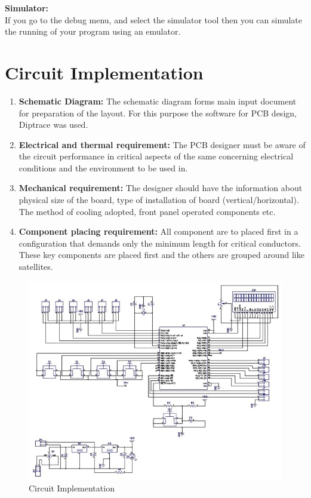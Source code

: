 \documentclass[12pt,a4paper,oneside,openright]{report}
\begin{document}
\textbf{Simulator:}\\
 If you go to the debug menu, and select the simulator tool then you can simulate the running of your program using an emulator.

\section{Circuit Implementation}
\begin{enumerate}
 \item \textbf{Schematic Diagram:} The schematic diagram forms main input document for preparation of the layout. For this purpose the software for PCB design, Diptrace was used.
\item \textbf{Electrical and thermal requirement:} The PCB designer must be aware of the circuit performance in critical aspects of the same concerning electrical conditions and the environment to be used in.
\item \textbf{Mechanical requirement:} The designer should have the information about physical size of the board, type of installation of board (vertical/horizontal). The method of cooling adopted, front panel operated components etc. 
\item \textbf{Component placing requirement:} All component are to placed first in a configuration that demands only the minimum length for critical conductors. These key components are placed first and the others are grouped around like satellites. 
\end{enumerate}
\begin{figure}[!h]
 \centering
 \includegraphics[width = \textwidth]{Figures/20.jpg}
 \caption{Circuit Implementation}
 \label{Circuit Implementation}
\end{figure}
\end{document}
